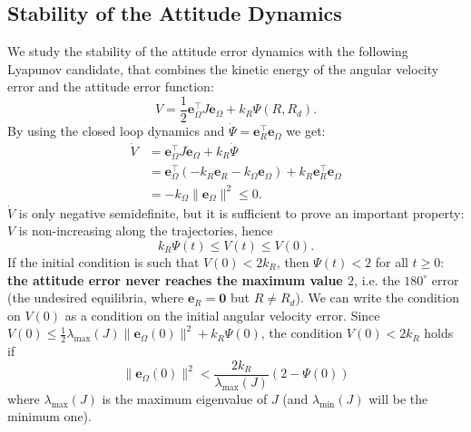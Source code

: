 \documentclass[10pt, a4paper]{report}
\begin{document}
\subsection{Stability of the Attitude Dynamics}
We study the stability of the attitude error dynamics with the following Lyapunov candidate, that combines the kinetic energy of the angular velocity error and the attitude error function:\begin{equation}
    V=\frac{1}{2}\mathbf e_\Omega^\top J\mathbf e_\Omega+k_R\Psi(R,R_d).
\end{equation}
By using the closed loop dynamics and $\dot\Psi=\mathbf e_R^\top\mathbf e_\Omega$ we get:\begin{align}
    \dot V&=\mathbf e_\Omega^\top J\dot{\mathbf e}_\Omega+k_R\dot\Psi\\
    &=\mathbf e_\Omega^\top(-k_R\mathbf e_R-k_\Omega\mathbf e_\Omega)+k_R\mathbf e_R^\top\mathbf e_\Omega\\
    &=-k_\Omega\|\mathbf e_\Omega\|^2\le0.
\end{align}
$\dot V$ is only negative semidefinite, but it is sufficient to prove an important property: $V$ is non-increasing along the trajectories, hence \begin{equation}
    k_R\Psi(t)\le V(t)\le V(0).
\end{equation}
If the initial condition is such that $V(0)<2k_R$, then $\Psi(t)<2$ for all $t\ge0$: \textbf{the attitude error never reaches the maximum value $2$}, i.e. the $180^\circ$ error (the undesired equilibria, where $\mathbf e_R=\mathbf 0$ but $R\ne R_d$). We can write the condition on $V(0)$ as a condition on the initial angular velocity error. Since $V(0)\le\frac{1}{2}\lambda_{\max}(J)\|\mathbf e_\Omega(0)\|^2+k_R\Psi(0)$, the condition $V(0)<2k_R$ holds if\begin{equation}\label{initial_condition_omega}
    \|\mathbf e_\Omega(0)\|^2<\frac{2k_R}{\lambda_{\max}(J)}\left(2-\Psi(0)\right)
\end{equation}
where $\lambda_{\max}(J)$ is the maximum eigenvalue of $J$ (and $\lambda_{\min}(J)$ will be the minimum one).\bigskip
\end{document}
